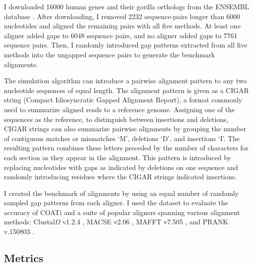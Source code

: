 \documentclass[12pt,letterpaper]{article}
\begin{document}
I downloaded 16000 human genes and their gorilla orthologs from the ENSEMBL
database \citep{ensembl_hubbard_2002}.
After downloading, I removed 2232 sequence-pairs longer than 6000 nucleotides and aligned the remaining pairs with all five methods.
At least one aligner added gaps to 6048 sequence pairs, and no aligner added gaps to 7761 sequence pairs.
Then, I randomly introduced gap patterns extracted from all five methods into the ungapped sequence pairs to generate the benchmark alignments.

The simulation algorithm can introduce a pairwise alignment pattern to any two nucleotide sequences of equal length. The alignment pattern is given as a CIGAR string (Compact Idiosyncratic Gapped Alignment Report), a format commonly used to summarize aligned reads to a reference genome. Assigning one of the sequences as the reference, to distinguish between insertions and deletions, CIGAR strings can also summarize pairwise alignments by grouping the number of contiguous matches or mismatches `M', deletions `D', and insertions `I'. The resulting pattern combines these letters preceded by the number of characters for each section as they appear in the alignment. This pattern is introduced by replacing nucleotides with gaps as indicated by deletions on one sequence and randomly introducing residues where the CIGAR strings indicated insertions.


I created the benchmark of alignments by using an equal number of randomly sampled gap patterns from each aligner.
I used the dataset to evaluate the accuracy of COATi and a suite of popular aligners spanning various alignment methods:
Clustal$\Omega$ v1.2.4 \citep{clustal_omega_sievers_2011},
MACSE v2.06 \citep{ranwez_macse_2011}, MAFFT v7.505
\citep{katoh2013mafft}, and PRANK v.150803 \citep{prank_loytynoja_2014}.

\subsection*{Metrics}
\end{document}
